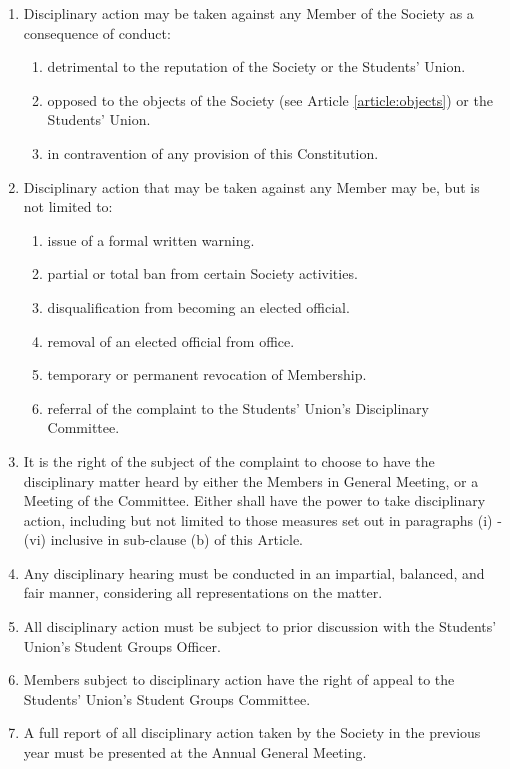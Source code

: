 \documentclass[12pt]{constitution}
\begin{document}

\label{article:disciplinary-action}

\begin{enumerate}
    \item Disciplinary action may be taken against any Member of the Society as a consequence of conduct:
    \begin{enumerate}
        \item detrimental to the reputation of the Society or the Students' Union.
        \item opposed to the objects of the Society (see Article \ref{article:objects}) or the Students' Union.
        \item in contravention of any provision of this Constitution.
    \end{enumerate}
    
    \item Disciplinary action that may be taken against any Member may be, but is not limited to:
    \begin{enumerate}
        \item issue of a formal written warning.
        \item partial or total ban from certain Society activities.
        \item disqualification from becoming an elected official.
        \item removal of an elected official from office.
        \item temporary or permanent revocation of Membership.
        \item referral of the complaint to the Students' Union's Disciplinary Committee.
    \end{enumerate}

    \item It is the right of the subject of the complaint to choose to have the disciplinary matter heard by either the Members in General Meeting, or a Meeting of the Committee.  Either shall have the power to take disciplinary action, including but not limited to those measures set out in paragraphs (i) - (vi) inclusive in sub-clause (b) of this Article.

    \item Any disciplinary hearing must be conducted in an impartial, balanced, and fair manner, considering all representations on the matter.

    \item All disciplinary action must be subject to prior discussion with the Students' Union's Student Groups Officer.

    \item Members subject to disciplinary action have the right of appeal to the Students' Union's Student Groups Committee.

    \item A full report of all disciplinary action taken by the Society in the previous year must be presented at the Annual General Meeting.
\end{enumerate}
\end{document}
